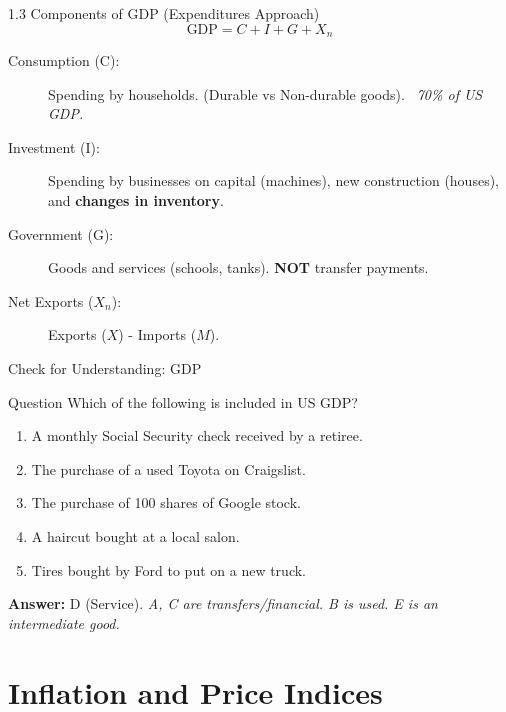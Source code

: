 \documentclass[aspectratio=169, 10pt]{beamer}
\begin{document}
\begin{frame}{1.3 Components of GDP (Expenditures Approach)}
    $$ \text{GDP} = C + I + G + X_n $$
    
    \begin{description}
        \item[Consumption (C):] Spending by households. (Durable vs Non-durable goods). \textit{~70\% of US GDP.}
        \item[Investment (I):] Spending by businesses on capital (machines), new construction (houses), and \textbf{changes in inventory}.
        \item[Government (G):] Goods and services (schools, tanks). \textbf{NOT} transfer payments.
        \item[Net Exports ($X_n$):] Exports ($X$) - Imports ($M$).
    \end{description}
\end{frame}

\begin{frame}{Check for Understanding: GDP}
    \begin{exampleblock}{Question}
    Which of the following is included in US GDP?
    \end{exampleblock}
    
    \begin{enumerate}[A]
        \item A monthly Social Security check received by a retiree.
        \item The purchase of a used Toyota on Craigslist.
        \item The purchase of 100 shares of Google stock.
        \item A haircut bought at a local salon.
        \item Tires bought by Ford to put on a new truck.
    \end{enumerate}
    \pause
    \textbf{Answer:} D (Service). \textit{A, C are transfers/financial. B is used. E is an intermediate good.}
\end{frame}

\section{Inflation and Price Indices}
\end{document}
